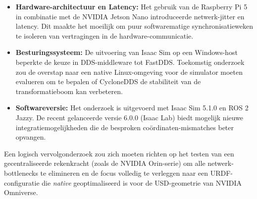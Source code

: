 \begin{itemize}
    \item \textbf{Hardware-architectuur en Latency:} Het gebruik van de Raspberry Pi 5 in combinatie met de NVIDIA Jetson Nano introduceerde netwerk-jitter en latency. Dit maakte het moeilijk om puur softwarematige synchronisatieweken te isoleren van vertragingen in de hardware-communicatie.
    \item \textbf{Besturingssysteem:} De uitvoering van Isaac Sim op een Windows-host beperkte de keuze in DDS-middleware tot FastDDS. Toekomstig onderzoek zou de overstap naar een native Linux-omgeving voor de simulator moeten evalueren om te bepalen of CycloneDDS de stabiliteit van de transformatieboom kan verbeteren.
    \item \textbf{Softwareversie:} Het onderzoek is uitgevoerd met Isaac Sim 5.1.0 en ROS 2 Jazzy. De recent gelanceerde versie 6.0.0 (Isaac Lab) biedt mogelijk nieuwe integratiemogelijkheden die de besproken coördinaten-mismatches beter opvangen.
\end{itemize}

Een logisch vervolgonderzoek zou zich moeten richten op het testen van een gecentraliseerde rekenkracht (zoals de NVIDIA Orin-serie) om alle netwerk-bottlenecks te elimineren en de focus volledig te verleggen naar een URDF-configuratie die \textit{native} geoptimaliseerd is voor de USD-geometrie van NVIDIA Omniverse.

